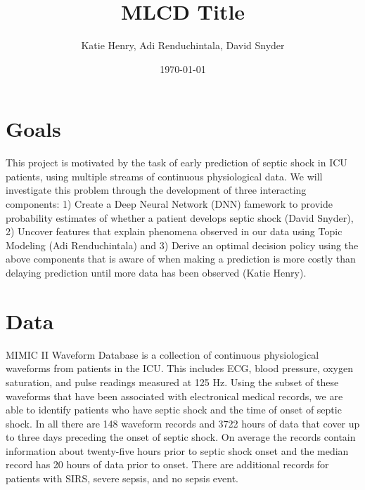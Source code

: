 \documentclass[dvips,12pt]{article}
\begin{document}

\title{MLCD Title}
\author{Katie Henry, Adi Renduchintala, David Snyder}
\date{\today}



\maketitle


\section{Goals}
This project is motivated by the task of early prediction of septic shock in ICU patients, using multiple streams of continuous physiological data. 
We will investigate this problem through the development of three interacting components:
1) Create a Deep Neural Network (DNN) famework to provide probability estimates of whether a patient develops septic shock (David Snyder),
2) Uncover features that explain phenomena observed in our data using Topic Modeling (Adi Renduchintala) and
3) Derive an optimal decision policy using the above components that is aware of when making a prediction is more costly than delaying prediction until more data has been observed (Katie Henry).


\section{Data}
MIMIC II Waveform Database is a collection of continuous physiological waveforms from patients in the ICU. This includes ECG, blood pressure, oxygen saturation, and pulse readings measured at 125 Hz. Using the subset of these waveforms that have been associated with electronical medical records, we are able to identify patients who have septic shock and the time of onset of septic shock. In all there are 148 waveform records and 3722 hours of data that cover up to three days preceding the onset of septic shock. On average the records contain information about twenty-five hours prior to septic shock onset and the median record has 20 hours of data prior to onset. There are additional records for patients with SIRS, severe sepsis, and no sepsis event.
\end{document}
